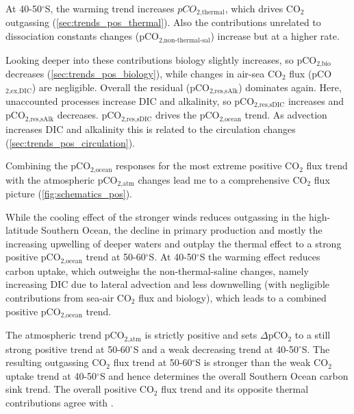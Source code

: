 At 40-50$^\circ$S, the warming trend increases $pCO_{\text{2,thermal}}$, which drives CO$_2$ outgassing (\autoref{sec:trends_pos_thermal}). Also the contributions unrelated to dissociation constants changes (pCO$_{\text{2,non-thermal-sal}}$) increase but at a higher rate. 

Looking deeper into these contributions biology slightly increases, so pCO$_{\text{2,bio}}$ decreases (\autoref{sec:trends_pos_biology}), while changes in air-sea CO$_2$ flux (pCO$_{\text{2,ex,DIC}}$) are negligible. Overall the residual (pCO$_{\text{2,res,sAlk}}$) dominates again. Here, unaccounted processes  increase \acs{DIC} and alkalinity, so pCO$_{\text{2,res,sDIC}}$ increases and pCO$_{\text{2,res,sAlk}}$ decreases. pCO$_{\text{2,res,sDIC}}$ drives the pCO$_{\text{2,ocean}}$ trend. As advection increases \acs{DIC} and alkalinity this is related to the circulation changes (\autoref{sec:trends_pos_circulation}).\newline

\label{sec:pCO2separation_pos}
Combining the pCO$_{\text{2,ocean}}$ responses for the most extreme positive CO$_2$ flux trend with the atmospheric pCO$_{\text{2,atm}}$ changes lead me to a comprehensive CO$_2$ flux picture (\autoref{fig:schematics_pos}). 

While the cooling effect of the stronger winds reduces outgassing in the high-latitude Southern Ocean, the decline in primary production and mostly the increasing upwelling of deeper waters and outplay the thermal effect to a strong positive pCO$_{\text{2,ocean}}$ trend at 50-60$^\circ$S. 
At 40-50$^\circ$S the warming effect reduces carbon uptake, which outweighs the non-thermal-saline changes, namely increasing \acs{DIC} due to lateral advection and less downwelling (with negligible contributions from sea-air CO$_2$ flux and biology), which leads to a combined positive pCO$_{\text{2,ocean}}$ trend. 

The atmospheric trend pCO$_{\text{2,atm}}$ is strictly positive and sets $\Delta$pCO$_{2}$ to a still strong positive trend at 50-60$^\circ$S and a weak decreasing trend at 40-50$^\circ$S. 
The resulting outgassing CO$_2$ flux trend at 50-60$^\circ$S is stronger than the weak CO$_2$ uptake trend at 40-50$^\circ$S and hence determines the overall Southern Ocean carbon sink trend. The overall positive CO$_2$ flux trend and its opposite thermal contributions agree with \cite{Lovenduski2007}.\newline

